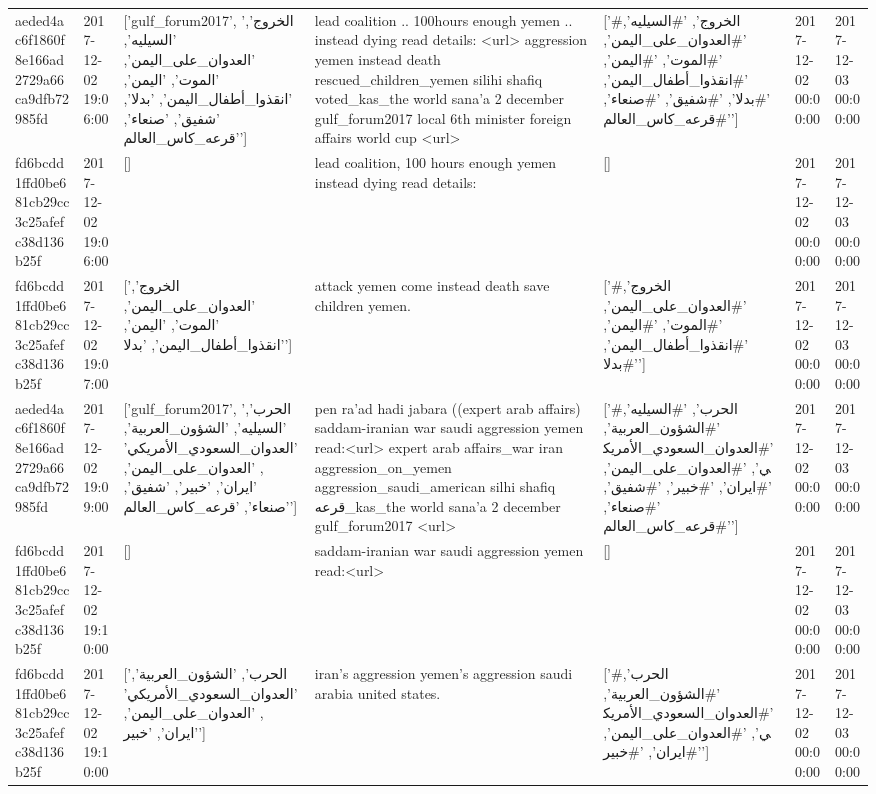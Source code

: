 \begin{tabular}{lllllll}
aeded4ac6f1860f8e166ad2729a66ca9dfb72985fd & 2017-12-02 19:06:00 & ['gulf_forum2017', 'الخروج', 'السيليه', 'العدوان_على_اليمن', 'الموت', 'اليمن', 'انقذوا_أطفال_اليمن', 'بدلا', 'شفيق', 'صنعاء', 'قرعه_كاس_العالم'] & lead coalition .. 100hours enough yemen .. instead dying read details: <url> aggression yemen instead death rescued\_children\_yemen silihi shafiq voted\_kas\_the world sana'a 2 december gulf\_forum2017 local 6th minister foreign affairs world cup <url> & ['#الخروج', '#السيليه', '#العدوان_على_اليمن', '#الموت', '#اليمن', '#انقذوا_أطفال_اليمن', '#بدلا', '#شفيق', '#صنعاء', '#قرعه_كاس_العالم'] & 2017-12-02 00:00:00 & 2017-12-03 00:00:00 \\
fd6bcdd1ffd0be681cb29cc3c25afefc38d136b25f & 2017-12-02 19:06:00 & [] & lead coalition, 100 hours enough yemen instead dying read details: & [] & 2017-12-02 00:00:00 & 2017-12-03 00:00:00 \\
fd6bcdd1ffd0be681cb29cc3c25afefc38d136b25f & 2017-12-02 19:07:00 & ['الخروج', 'العدوان_على_اليمن', 'الموت', 'اليمن', 'انقذوا_أطفال_اليمن', 'بدلا'] & attack yemen come instead death save children yemen. & ['#الخروج', '#العدوان_على_اليمن', '#الموت', '#اليمن', '#انقذوا_أطفال_اليمن', '#بدلا'] & 2017-12-02 00:00:00 & 2017-12-03 00:00:00 \\
aeded4ac6f1860f8e166ad2729a66ca9dfb72985fd & 2017-12-02 19:09:00 & ['gulf_forum2017', 'الحرب', 'السيليه', 'الشؤون_العربية', 'العدوان_السعودي_الأمريكي', 'العدوان_على_اليمن', 'ايران', 'خبير', 'شفيق', 'صنعاء', 'قرعه_كاس_العالم'] & pen ra'ad hadi jabara ((expert arab affairs) saddam-iranian war saudi aggression yemen read:<url> expert arab affairs\_war iran aggression\_on\_yemen aggression\_saudi\_american silhi shafiq قرعه\_kas\_the world sana'a 2 december gulf\_forum2017 <url> & ['#الحرب', '#السيليه', '#الشؤون_العربية', '#العدوان_السعودي_الأمريكي', '#العدوان_على_اليمن', '#ايران', '#خبير', '#شفيق', '#صنعاء', '#قرعه_كاس_العالم'] & 2017-12-02 00:00:00 & 2017-12-03 00:00:00 \\
fd6bcdd1ffd0be681cb29cc3c25afefc38d136b25f & 2017-12-02 19:10:00 & [] & saddam-iranian war saudi aggression yemen read:<url> & [] & 2017-12-02 00:00:00 & 2017-12-03 00:00:00 \\
fd6bcdd1ffd0be681cb29cc3c25afefc38d136b25f & 2017-12-02 19:10:00 & ['الحرب', 'الشؤون_العربية', 'العدوان_السعودي_الأمريكي', 'العدوان_على_اليمن', 'ايران', 'خبير'] & iran's aggression yemen's aggression saudi arabia united states. & ['#الحرب', '#الشؤون_العربية', '#العدوان_السعودي_الأمريكي', '#العدوان_على_اليمن', '#ايران', '#خبير'] & 2017-12-02 00:00:00 & 2017-12-03 00:00:00 \\

\end{tabular}
